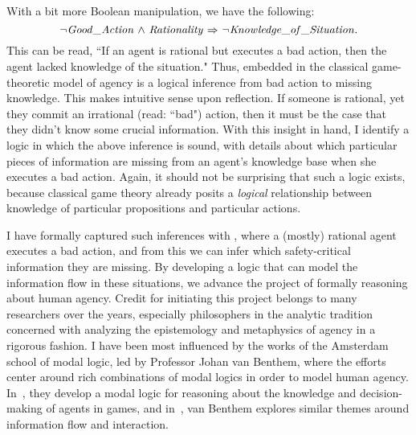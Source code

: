 With a bit more Boolean manipulation, we have the following:
\begin{equation*}
{\neg} \mathit{Good\_Action} {\ \wedge \ } \mathit{Rationality} {\ \Rightarrow \ } {\neg} \mathit{Knowledge\_of\_Situation}.
\end{equation*}
This can be read, ``If an agent is rational but executes a bad action, then the agent lacked knowledge of the situation." Thus, embedded in the classical game-theoretic model of agency is a logical inference from bad action to missing knowledge. This makes intuitive sense upon reflection. If someone is rational, yet they commit an irrational (read: ``bad") action, then it must be the case that they didn't know some crucial information. With this insight in hand, I identify a logic in which the above inference is sound, with details about which particular pieces of information are missing from an agent's knowledge base when she executes a bad action. Again, it should not be surprising that such a logic exists, because classical game theory already posits a \emph{logical} relationship between knowledge of particular propositions and particular actions.

I have formally captured such inferences with \DASL, where a (mostly) rational agent executes a bad action, and from this we can infer which safety-critical information they are missing. By developing a logic that can model the information flow in these situations, we advance the project of formally reasoning about human agency. Credit for initiating this project belongs to many researchers over the years, especially philosophers in the analytic tradition concerned with analyzing the epistemology and metaphysics of agency in a rigorous fashion. I have been most influenced by the works of the Amsterdam school of modal logic, led by Professor Johan van Benthem, where the efforts center around rich combinations of modal logics in order to model human agency. In~\cite{VB_TowardPlay}, they develop a modal logic for reasoning about the knowledge and decision-making of agents in games, and in~\cite{VB_LDII}, van Benthem explores similar themes around information flow and interaction.


